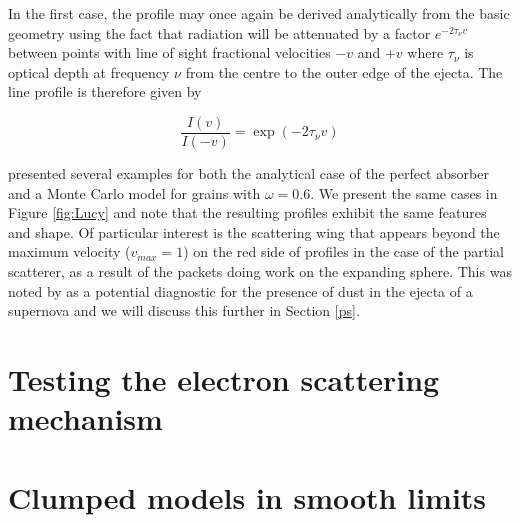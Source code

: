 In the first case, the profile may once again be derived analytically from 
the basic geometry using the fact that radiation will be attenuated by a 
factor $e^{-2\tau_{\nu} v}$ between points with line of sight fractional velocities $-v$ and 
$+v$ where $\tau_{\nu}$ is optical depth at frequency $\nu$ from the centre to the outer edge of the ejecta.  The line profile is therefore given by

\begin{equation}
\frac{I(v)}{I(-v)} = \exp(-2\tau_{\nu} v)  
\end{equation}

\citet{Lucy1989} presented several examples for both the analytical case of 
the perfect absorber and a Monte Carlo model for grains with $\omega 
=0.6$.  We present the same cases in Figure \ref{fig:Lucy} and note that 
the resulting profiles exhibit the same features and shape. Of particular 
interest is the scattering wing that appears beyond the maximum velocity 
($v_{max}=1$) on the red side of profiles in the case of the partial 
scatterer, as a result of the packets doing work on the expanding sphere.  
This was noted by \citet{Lucy1989} as a potential diagnostic for the 
presence of dust in the ejecta of a supernova and we will discuss this 
further in Section \ref{ps}.

\section{Testing the electron scattering mechanism}
\section{Clumped models in smooth limits}


